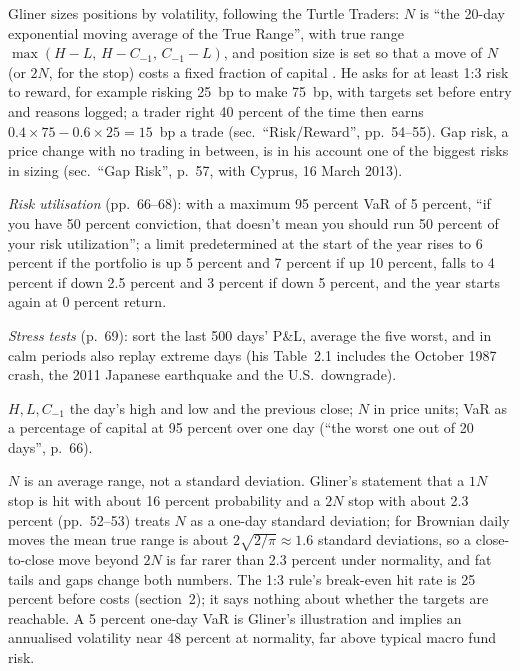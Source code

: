 \begin{qfmethod}\label{meth:macro-position-sizing-risk}
 Gliner sizes positions by volatility, following the Turtle Traders: $N$ is ``the 20-day exponential moving average of the True Range'', with true range $\max(H-L,\,H-C_{-1},\,C_{-1}-L)$, and position size is set so that a move of $N$ (or $2N$, for the stop) costs a fixed fraction of capital \citep[chap.~2, secs.\ ``Unit Size'' and ``Volatility Adjusting Position Size'', PDF pp.~50--53]{s7-gliner}. He asks for at least 1:3 risk to reward, for example risking 25~bp to make 75~bp, with targets set before entry and reasons logged; a trader right 40 percent of the time then earns $0.4\times75-0.6\times25=15$~bp a trade (sec.\ ``Risk/Reward'', pp.~54--55). Gap risk, a price change with no trading in between, is in his account one of the biggest risks in sizing (sec.\ ``Gap Risk'', p.~57, with Cyprus, 16 March 2013).

\emph{Risk utilisation} (pp.~66--68): with a maximum 95 percent VaR of 5 percent, ``if you have 50 percent conviction, that doesn't mean you should run 50 percent of your risk utilization''; a limit predetermined at the start of the year rises to 6 percent if the portfolio is up 5 percent and 7 percent if up 10 percent, falls to 4 percent if down 2.5 percent and 3 percent if down 5 percent, and the year starts again at 0 percent return.

\emph{Stress tests} (p.~69): sort the last 500 days' P\&L, average the five worst, and in calm periods also replay extreme days (his Table~2.1 includes the October 1987 crash, the 2011 Japanese earthquake and the U.S.\ downgrade).

 $H,L,C_{-1}$ the day's high and low and the previous close; $N$ in price units; VaR as a percentage of capital at 95 percent over one day (``the worst one out of 20 days'', p.~66).

 $N$ is an average range, not a standard deviation. Gliner's statement that a $1N$ stop is hit with about 16 percent probability and a $2N$ stop with about 2.3 percent (pp.~52--53) treats $N$ as a one-day standard deviation; for Brownian daily moves the mean true range is about $2\sqrt{2/\pi}\approx1.6$ standard deviations, so a close-to-close move beyond $2N$ is far rarer than 2.3 percent under normality, and fat tails and gaps change both numbers. The 1:3 rule's break-even hit rate is 25 percent before costs (section~2); it says nothing about whether the targets are reachable. A 5 percent one-day VaR is Gliner's illustration and implies an annualised volatility near 48 percent at normality, far above typical macro fund risk.


\end{qfmethod}
